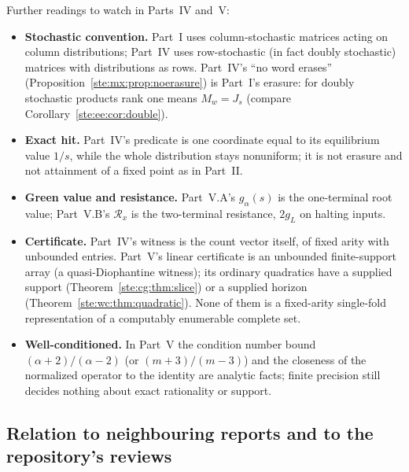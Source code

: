 \documentclass[11pt,letterpaper]{article}
\theoremstyle{definition}
\theoremstyle{remark}
\begin{document}
Further readings to watch in Parts~IV and~V:
\begin{itemize}
\item \textbf{Stochastic convention.} Part~I uses column-stochastic matrices acting on column distributions; Part~IV uses row-stochastic (in fact doubly stochastic) matrices with distributions as rows. Part~IV's ``no word erases'' (Proposition~\ref{ste:mx:prop:noerasure}) is Part~I's erasure: for doubly stochastic products rank one means $M_w=J_s$ (compare Corollary~\ref{ste:ee:cor:double}).
\item \textbf{Exact hit.} Part~IV's predicate is one coordinate equal to its equilibrium value $1/s$, while the whole distribution stays nonuniform; it is not erasure and not attainment of a fixed point as in Part~II.
\item \textbf{Green value and resistance.} Part~V.A's $g_\alpha(s)$ is the one-terminal root value; Part~V.B's $\mathcal R_x$ is the two-terminal resistance, $2g_L$ on halting inputs.
\item \textbf{Certificate.} Part~IV's witness is the count vector itself, of fixed arity with unbounded entries. Part~V's linear certificate is an unbounded finite-support array (a quasi-Diophantine witness); its ordinary quadratics have a supplied support (Theorem~\ref{ste:cg:thm:slice}) or a supplied horizon (Theorem~\ref{ste:wc:thm:quadratic}). None of them is a fixed-arity single-fold representation of a computably enumerable complete set.
\item \textbf{Well-conditioned.} In Part~V the condition number bound $(\alpha+2)/(\alpha-2)$ (or $(m+3)/(m-3)$) and the closeness of the normalized operator to the identity are analytic facts; finite precision still decides nothing about exact rationality or support.
\end{itemize}

\subsection{Relation to neighbouring reports and to the repository's reviews}\label{ste:sec:relation}
\end{document}
